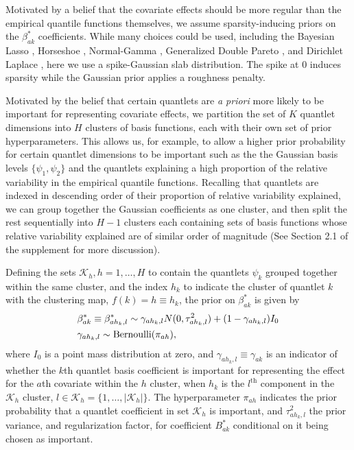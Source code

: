 \documentclass[11pt]{article}
\begin{document}
Motivated by a belief that the covariate effects should be more regular than the empirical quantile functions themselves, we assume sparsity-inducing priors on the $\beta^*_{ak}$ coefficients.
While many choices could be used, including the Bayesian Lasso
\cite{park2008bayesian}, Horseshoe \cite{carvalho2010horseshoe}, Normal-Gamma \cite{griffin2010inference}, Generalized Double Pareto \cite{armagan2013generalized}, and Dirichlet Laplace \cite{bhattacharya2015dirichlet}, here we use a spike-Gaussian slab \cite{lempers1971posterior,mitchell1988bayesian} distribution.  The spike at 0 induces sparsity while the Gaussian prior applies a roughness penalty.

Motivated by the belief that certain quantlets are \textit{a priori} more likely to be important for representing covariate effects, we partition the set of $K$ quantlet dimensions into $H$ clusters of basis functions, each with their own set of prior hyperparameters.  This allows us, for example, to allow a higher prior probability for certain quantlet dimensions to be important  such as the 
the Gaussian basis levels $\{\psi_1, \psi_2\}$ and the quantlets explaining a high proportion of the relative variability in the empirical quantile functions.  Recalling that quantlets are indexed in descending order of their proportion of relative variability explained, we can group together the Gaussian coefficients as one cluster, and then split the rest sequentially into $H-1$ clusters each containing sets of basis functions whose relative variability explained are of similar order of magnitude  (See Section 2.1 of the supplement for more discussion). 


Defining the sets $\mathcal{K}_h, h=1, \ldots, H$ to contain the quantlets $\psi_k$ grouped together within the same cluster, and the index $h_k$ to indicate the cluster of quantlet $k$ with the clustering map, $f(k)=h\equiv h_k$, the prior on $\beta^*_{ak}$ is given by
  \begin{align}    \label{p5_prior_B} 
 & \beta_{ak}^* \equiv\beta_{ah_k,l}^*  \sim  \gamma_{ah_k,l} N(0, \tau^2_{ah_k,l}) + (1-\gamma_{ah_k,l})I_{0}       \\
 &\gamma_{ah_k,l}  \sim \text{Bernoulli}(\pi_{ah}) ,      \notag 
  \end{align}
  where $I_{0}$ is a point mass distribution at zero, and $\gamma_{ah_k,l} \equiv \gamma_{ak}$ is an indicator of whether the $k$th quantlet basis coefficient is important for representing the effect for the $a$th covariate within the $h$ cluster,   when $h_k$ is the $l^{\text{th}}$ component in the $\mathcal K_{h}$ cluster, 
  $l \in \mathcal{K}_h = \{1,\dots,|\mathcal{K}_h| \}$.    
 The hyperparameter $\pi_{ah}$ indicates the prior probability that a quantlet coefficient in set 
  $\mathcal{K}_h$ is important, and $\tau^2_{ah_k,l}$ the prior variance, and regularization factor, for coefficient $B^*_{ak}$ conditional on it being chosen as important.  
  
\end{document}
